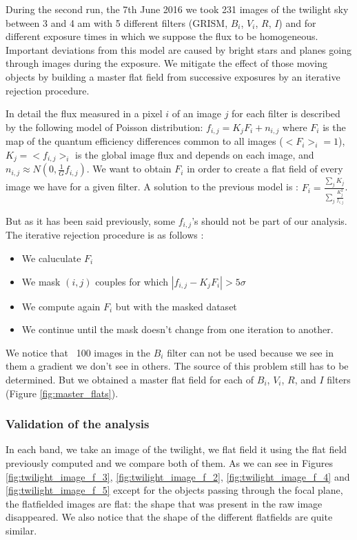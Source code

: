 \documentclass[\docopts]{\docclass}
\begin{document}
During the second run, the 7th June 2016 we took 231 images of the
twilight sky between 3 and 4 am with 5 different filters (GRISM,
$B_i$, $V_i$, $R$, $I$) and for different exposure times in which we
suppose the flux to be homogeneous. Important deviations from this
model are caused by bright stars and planes going through images
during the exposure. We mitigate the effect of those moving objects by
building a master flat field from successive exposures by an iterative
rejection procedure.

In detail the flux measured in a pixel $i$ of an image $j$ for each
filter is described by the following model of Poisson distribution:
$f_{i,j} = K_jF_i + n_{i,j}$ where $F_i$ is the map of the quantum
efficiency differences common to all images ($<F_i>_i = 1$), $K_j =
<f_{i, j}>_i$ is the global image flux and depends on each image, and
$n_{i, j} \approx N(0, \frac{1}{G}f_{i, j})$.  We want to obtain $F_i$
in order to create a flat field of every image we have for a given
filter.  A solution to the previous model is : $F_i =
\frac{\sum_jK_j}{\sum_j \frac{K_j^2}{f_{i, j}}}$.

But as it has been said previously, some $f_{i, j}$'s should not be
part of our analysis.  The iterative rejection procedure is as follows
:
\begin{itemize}
\item We caluculate $F_i$
\item We mask $(i, j)$ couples for which $|f_{i, j} - K_jF_i| > 5\sigma$
\item We compute again $F_i$ but with the masked dataset
\item We continue until the mask doesn't change from one iteration to another.
\end{itemize}
We notice that ~100 images in the $B_i$ filter can not be used because
we see in them a gradient we don't see in others. The source of this
problem still has to be determined.  But we obtained a master flat
field for each of $B_i$, $V_i$, $R$, and $I$ filters (Figure
\ref{fig:master_flats}).

\subsubsection{Validation of the analysis}
In each band, we take an image of the twilight, we flat field it using
the flat field previously computed and we compare both of them.  As we
can see in Figures \ref{fig:twilight_image_f_3},
\ref{fig:twilight_image_f_2}, \ref{fig:twilight_image_f_4} and
\ref{fig:twilight_image_f_5} except for the objects passing through
the focal plane, the flatfielded images are flat: the shape that was
present in the raw image disappeared. We also notice that the shape of
the different flatfields are quite similar.
\end{document}
